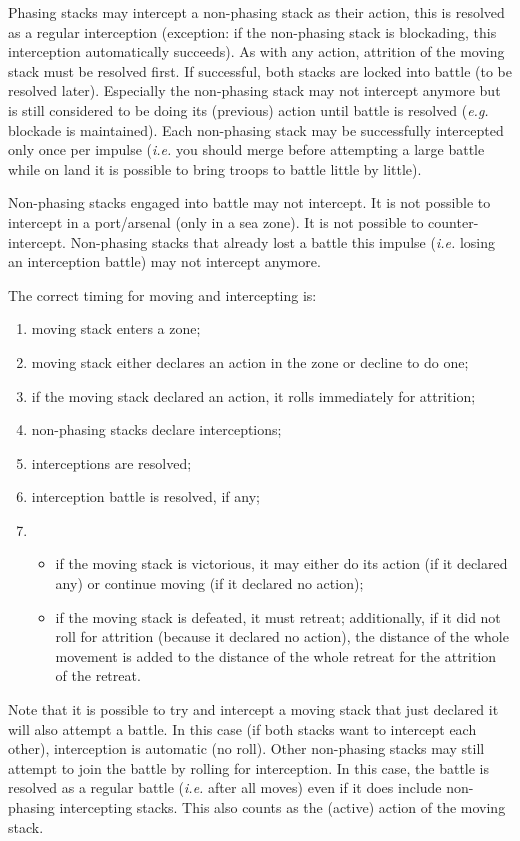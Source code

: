 Phasing stacks may intercept a non-phasing stack as their action, this is
resolved as a regular interception (exception: if the non-phasing stack is
blockading, this interception automatically succeeds). As with any action,
attrition of the moving stack must be resolved first. If successful, both
stacks are locked into battle (to be resolved later). Especially the
non-phasing stack may not intercept anymore but is still considered to be
doing its (previous) action until battle is resolved (\emph{e.g.} blockade is
maintained). Each non-phasing stack may be successfully intercepted only once
per impulse (\emph{i.e.} you should merge before attempting a large battle
while on land it is possible to bring troops to battle little by little).

Non-phasing stacks engaged into battle may not intercept. It is not possible
to intercept in a port/arsenal (only in a sea zone). It is not possible to
counter-intercept. Non-phasing stacks that already lost a battle this impulse
(\emph{i.e.} losing an interception battle) may not intercept anymore.

The correct timing for moving and intercepting is:
\begin{enumerate}
\item moving stack enters a zone;
\item moving stack either declares an action in the zone or decline to do one;
\item if the moving stack declared an action, it rolls immediately for
  attrition;
\item non-phasing stacks declare interceptions;
\item interceptions are resolved;
\item interception battle is resolved, if any;
\item
  \begin{itemize}
  \item if the moving stack is victorious, it may either do its action (if it
    declared any) or continue moving (if it declared no action);
  \item if the moving stack is defeated, it must retreat; additionally, if it
    did not roll for attrition (because it declared no action), the distance
    of the whole movement is added to the distance of the whole retreat for
    the attrition of the retreat.
  \end{itemize}
\end{enumerate}

Note that it is possible to try and intercept a moving stack that just
declared it will also attempt a battle. In this case (if both stacks want to
intercept each other), interception is automatic (no roll). Other non-phasing
stacks may still attempt to join the battle by rolling for interception. In
this case, the battle is resolved as a regular battle (\emph{i.e.} after all
moves) even if it does include non-phasing intercepting stacks. This also
counts as the (active) action of the moving stack.


